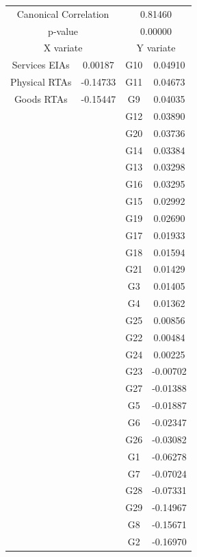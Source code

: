 \begin{figure}
  \begin{subfigure}{.65\textwidth}
  \centering
  \begin{tabular}{ c c | c c }
    \multicolumn{2}{c}{Canonical Correlation} &  \multicolumn{2}{c}{0.81460} \\
    \multicolumn{2}{c}{p-value} &  \multicolumn{2}{c}{0.00000} \\
    \hline
    \multicolumn{2}{c}{X variate} & \multicolumn{2}{c}{Y variate}\\
    \hline
  Services EIAs & 0.00187 &  G10 & 0.04910\\
  Physical RTAs & -0.14733 &  G11 & 0.04673\\
  Goods RTAs & -0.15447 &  G9 & 0.04035\\
  & &  G12 & 0.03890\\
  & &  G20 & 0.03736\\
  & &  G14 & 0.03384\\
  & &  G13 & 0.03298\\
  & &  G16 & 0.03295\\
  & &  G15 & 0.02992\\
  & &  G19 & 0.02690\\
  & &  G17 & 0.01933\\
  & &  G18 & 0.01594\\
  & &  G21 & 0.01429\\
  & &  G3 & 0.01405\\
  & &  G4 & 0.01362\\
  & &  G25 & 0.00856\\
  & &  G22 & 0.00484\\
  & &  G24 & 0.00225\\
  & &  G23 & -0.00702\\
  & &  G27 & -0.01388\\
  & &  G5 & -0.01887\\
  & &  G6 & -0.02347\\
  & &  G26 & -0.03082\\
  & &  G1 & -0.06278\\
  & &  G7 & -0.07024\\
  & &  G28 & -0.07331\\
  & &  G29 & -0.14967\\
  & &  G8 & -0.15671\\
  & &  G2 & -0.16970\\
  \end{tabular}

  \end{subfigure}
  \begin{subfigure}{.25\textwidth}
    \centering 
	

\end{subfigure}
\end{figure}
